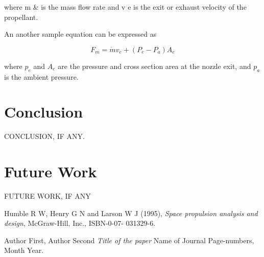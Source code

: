 \documentclass[12pt, a4paper]{article}
\begin{document}
where m & is the mass flow rate and v e is the exit or exhaust velocity of the
propellant. 

An another sample equation can be expressed as

\begin{equation} F_m= \dot{m}v_e + (P_e - P_a)A_e \end{equation}

where $p_e$ and $A_e$ are the pressure and cross section area at the nozzle exit, and $p_a$ is
the ambient pressure.


\newpage
\section{Conclusion}
CONCLUSION, IF ANY.

\newpage
\section{Future Work}
FUTURE WORK, IF ANY

\newpage
\begin{thebibliography}
      
Humble R W, Henry G N and Larson W J (1995), \emph{Space propulsion analysis and design}, McGraw-Hill, Inc., ISBN-0-07-
031329-6.

Author First, Author Second \emph{Title of the paper} Name of Journal Page-numbers,
Month Year.


\end{thebibliography}
\end{document}
